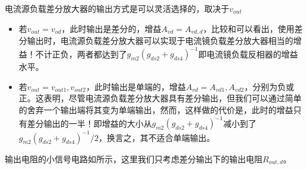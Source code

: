 电流源负载差分放大器的输出方式是可以灵活选择的，取决于$v_{out}$
\begin{itemize}
    \item 若$v_{out}=v_{od}$，此时输出是差分的，增益$A_{vd}=A_{vd,d}$，比较和可以看出，使用差分输出时，电流源负载差分放大器可以实现于电流镜负载差分放大器相当的增益！不计正负，两者都达到了$g_{m2}(g_{ds2}+g_{ds4})^{-1}$即电流镜负载反相器的增益水平。
    \item 若$v_{out}=v_{out1},v_{out2}$，此时输出是单端的，增益$A_{vd}=A_{vd1},A_{vd2}$，分别为负或正。这表明，尽管电流源负载差分放大器具有差分输出，但我们可以通过简单的舍弃一个输出端将其变为单端输出，然而，这样做的代价是，此时的增益只有差分输出的一半！即增益的大小从$g_{m2}(g_{ds2}+g_{ds4})^{-1}$减小到了$g_{m2}(g_{ds2}+g_{ds4})^{-1}/2$，换言之，其不适合单端输出。
\end{itemize}
输出电阻的小信号电路如所示，这里我们只考虑差分输出下的输出电阻$R_{out,d}$。

